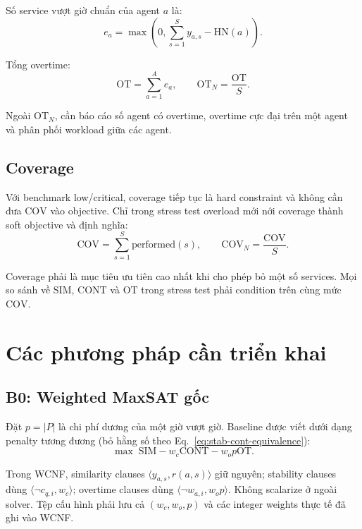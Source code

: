 \documentclass[12pt,a4paper]{article}
\newcommand{\SIM}{\mathrm{SIM}}
\newcommand{\CONT}{\mathrm{CONT}}
\newcommand{\OT}{\mathrm{OT}}
\newcommand{\COV}{\mathrm{COV}}
\newcommand{\HN}{\mathrm{HN}}
\begin{document}
Số service vượt giờ chuẩn của agent $a$ là:
\begin{equation}
  e_a=\max\left(0,\sum_{s=1}^{S}y_{a,s}-\HN(a)\right).
  \label{eq:agent-overtime}
\end{equation}

Tổng overtime:
\begin{equation}
  \OT=\sum_{a=1}^{A}e_a,
  \qquad
  \OT_N=\frac{\OT}{S}.
  \label{eq:overtime}
\end{equation}

Ngoài $\OT_N$, cần báo cáo số agent có overtime, overtime cực đại trên một
agent và phân phối workload giữa các agent.

\subsection{Coverage}

Với benchmark low/critical, coverage tiếp tục là hard constraint và không cần
đưa $\COV$ vào objective. Chỉ trong stress test overload mới nới coverage thành
soft objective và định nghĩa:
\begin{equation}
  \COV=\sum_{s=1}^{S}\mathrm{performed}(s),
  \qquad
  \COV_N=\frac{\COV}{S}.
  \label{eq:coverage}
\end{equation}

Coverage phải là mục tiêu ưu tiên cao nhất khi cho phép bỏ một số services.
Mọi so sánh về $\SIM$, $\CONT$ và $\OT$ trong stress test phải condition trên
cùng mức $\COV$.

\section{Các phương pháp cần triển khai}

\subsection{B0: Weighted MaxSAT gốc}

Đặt $p=|P|$ là chi phí dương của một giờ vượt giờ. Baseline được viết dưới
dạng penalty tương đương (bỏ hằng số theo
Eq.~\eqref{eq:stab-cont-equivalence}):
\begin{equation}
  \max\; \SIM-w_c\CONT-w_o p\OT.
  \label{eq:weighted-baseline}
\end{equation}

Trong WCNF, similarity clauses $\langle y_{a,s},r(a,s)\rangle$ giữ nguyên;
stability clauses dùng $\langle\neg c_{q,i},w_c\rangle$; overtime clauses dùng
$\langle\neg w_{a,i},w_o p\rangle$. Không scalarize ở ngoài solver. Tệp cấu
hình phải lưu cả $(w_c,w_o,p)$ và các integer weights thực tế đã ghi vào WCNF.
\end{document}
